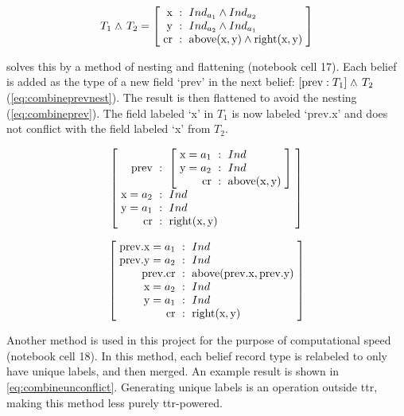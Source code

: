 \begin{equation} \label{eq:merge}
T_1  \ttrmerge T_2 =
\rec{
    \text{x} &:& Ind_{a_1} \wedge Ind_{a_2} \\
    \text{y} &:& Ind_{a_2} \wedge Ind_{a_1} \\
    \text{cr} &:& \text{above}(\text{x}, \text{y}) \wedge \text{right}(\text{x}, \text{y})
    }
\end{equation}

\cite{CooperTypetheorylanguage2016} solves this by a method of nesting and flattening (notebook cell 17).
Each belief is added as the type of a new field `prev' in the next belief: $[\text{prev} : T_1] \mathrel{\wedge_{\mkern-10mu\cdot\mkern6mu}} T_2$ (\autoref{eq:combineprevnest}).
The result is then flattened to avoid the nesting (\autoref{eq:combineprev}).
The field labeled `x' in $T_1$ is now labeled `prev.x' and does not conflict with the field labeled `x' from $T_2$.

\begin{equation} \label{eq:combineprevnest}
\rec{
    \text{prev} &:& \rec{
        \text{x}=a_1 &:& Ind \\
        \text{y}=a_2 &:& Ind \\
        \text{cr} &:& \text{above}(\text{x}, \text{y}) \\
        } \\
    \text{x}=a_2 &:& Ind \\
    \text{y}=a_1 &:& Ind \\
    \text{cr} &:& \text{right}(\text{x}, \text{y})
    }
\end{equation}

\begin{equation} \label{eq:combineprev}
\rec{
    \text{prev.x}=a_1 &:& Ind \\
    \text{prev.y}=a_2 &:& Ind \\
    \text{prev.cr} &:& \text{above}(\text{prev.x}, \text{prev.y}) \\
    \text{x}=a_2 &:& Ind \\
    \text{y}=a_1 &:& Ind \\
    \text{cr} &:& \text{right}(\text{x}, \text{y})
    }
\end{equation}

Another method is used in this project for the purpose of computational speed (notebook cell 18).
In this method, each belief record type is relabeled to only have unique labels, and then merged.
An example result is shown in \autoref{eq:combineunconflict}.
Generating unique labels is an operation outside \gls{ttr}, making this method less purely \gls{ttr}-powered.

